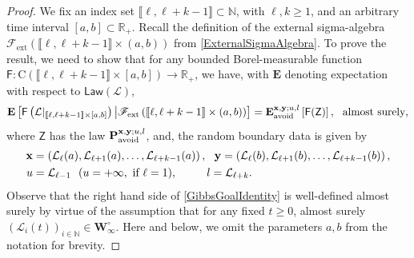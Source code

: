 \documentclass[]{article}
\begin{document}
\begin{proof}

We fix an index set
$ \llbracket \ell , \ell+k-1 \rrbracket \subset \mathbb{N}$, with $\ell,k\ge 1$,
and an arbitrary time interval \([a,b]\subset{\mathbb{R}_+}\).
Recall the definition of the external sigma-algebra $\mathscr{F}_{\mathrm{ext}}\left(\llbracket \ell, \ell+k-1 \rrbracket \times (a,b) \right)$ from \eqref{ExternalSigmaAlgebra}. To prove the result, we need to show that
for any bounded Borel-measurable function
$\mathsf{F}: \mathrm{C}\left(\llbracket \ell, \ell+k-1 \rrbracket \times [a,b]\right) \to \mathbb{R}_+$,
we have, with $\mathbf{E}$ denoting expectation with respect to $\mathsf{Law}(\mathcal{L})$,
\begin{equation}\label{GibbsGoalIdentity}
\mathbf{E}\left[ \mathsf{F}\left(\mathcal{L}|_{\llbracket \ell, \ell+k-1 \rrbracket \times [a,b]}\right) \big| \mathscr{F}_{\mathrm{ext}}\left(\llbracket \ell, \ell+k-1\rrbracket\times (a,b)\right) \right]
= \mathbf{E}_{\mathrm{avoid}}^{\mathbf{x},\mathbf{y};u,l}\left[\mathsf{F}(\mathsf{Z})\right], \  \ \textnormal{almost surely},  
\end{equation}
where $\mathsf{Z}$ has the law
$\mathbf{P}_{\textnormal{avoid}}^{\mathbf{x},\mathbf{y};u,l}$,
and, the random boundary data is given by
\begin{align*}
\mathbf{x}&=\left(\mathcal{L}_{\ell}(a),\mathcal{L}_{\ell+1}(a),\dots,\mathcal{L}_{\ell+k-1}(a)\right),\  \ \mathbf{y}=
\left(\mathcal{L}_{\ell}(b),\mathcal{L}_{\ell+1}(b),\dots,\mathcal{L}_{\ell+k-1}(b)\right),
\\ u&=
\mathcal{L}_{\ell-1}\  \  (u=+\infty, \textnormal{ if } \ell=1),\hspace{7mm}\  \ l=
\mathcal{L}_{\ell+k}.
\end{align*}
Observe that the right hand side of \eqref{GibbsGoalIdentity} is well-defined almost surely by virtue of the assumption that for any fixed $t\ge 0$, almost surely $(\mathcal{L}_i(t))_{i\in \mathbb{N}}\in \mathbf{W}_\infty^\circ$. Here and below, we omit the parameters $a,b$ from the notation for brevity.



\end{proof}
\end{document}
